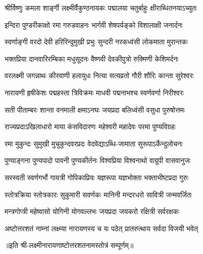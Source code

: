 
\twolineshloka
{श्रीर्विष्णुः कमला शार्ङ्गी लक्ष्मीर्वैकुण्ठनायकः}
{पद्मालया चतुर्बाहुः क्षीराब्धितनयाऽच्युतः}%

\twolineshloka
{इन्दिरा पुण्डरीकाक्षो रमा गरुडवाहनः}
{भार्गवी शेषपर्यङ्को विशालाक्षी जनार्दनः}%

\twolineshloka
{स्वर्णाङ्गी वरदो देवी हरिरिन्दुमुखी प्रभुः}
{सुन्दरी नरकध्वंसी लोकमाता मुरान्तकः}%

\twolineshloka
{भक्तप्रिया दानवारिरम्बिका मधुसूदनः}
{वैष्णवी देवकीपुत्रो रुक्मिणी केशिमर्दनः}%

\twolineshloka
{वरलक्ष्मी जगन्नाथः कीरवाणी हलायुधः}
{नित्या सत्यव्रतो गौरी शौरिः कान्ता सुरेश्वरः}

\twolineshloka
{नारायणी हृषीकेशः पद्महस्ता त्रिविक्रमः}
{माधवी पद्मनाभश्च स्वर्णवर्णा निरीश्वरः}

\twolineshloka
{सती पीताम्बरः शान्ता वनमाली क्षमाऽनघः}
{जयप्रदा बलिध्वंसी वसुधा पुरुषोत्तमः}

\twolineshloka
{राज्यप्रदाऽखिलाधारो माया कंसविदारणः}
{महेश्वरी महादेवः परमा पुण्यविग्रहः}


\twolineshloka
{रमा मुकुन्दः सुमुखी मुचुकुन्दवरप्रदः}
{वेदवेद्याऽब्धि-जामाता सुरूपाऽर्केन्दुलोचनः}

\twolineshloka
{पुण्याङ्गना पुण्यपादो पावनी पुण्यकीर्तनः}
{विश्वप्रिया विश्वनाथो वाग्रूपी वासवानुजः}

\twolineshloka
{सरस्वती स्वर्णगर्भो गायत्री गोपिकाप्रियः}
{यज्ञरूपा यज्ञभोक्ता भक्ताभीष्टप्रदा गुरुः}

\twolineshloka
{स्तोत्रक्रिया स्तोत्रकारः सुकुमारी सवर्णकः}
{मानिनी मन्दरधरो सावित्री जन्मवर्जितः}

\twolineshloka
{मन्त्रगोप्त्री महेष्वासो योगिनी योगवल्लभः}
{जयप्रदा जयकरो रक्षित्री सर्वरक्षकः}

\twolineshloka
{अष्टोत्तरशतं नाम्नां लक्ष्म्या नारायणस्य च}
{यः पठेत् प्रातरुत्थाय सर्वदा विजयी भवेत्}

॥इति श्री-लक्ष्मीनारायणाष्टोत्तरशतनामस्तोत्रं सम्पूर्णम्॥